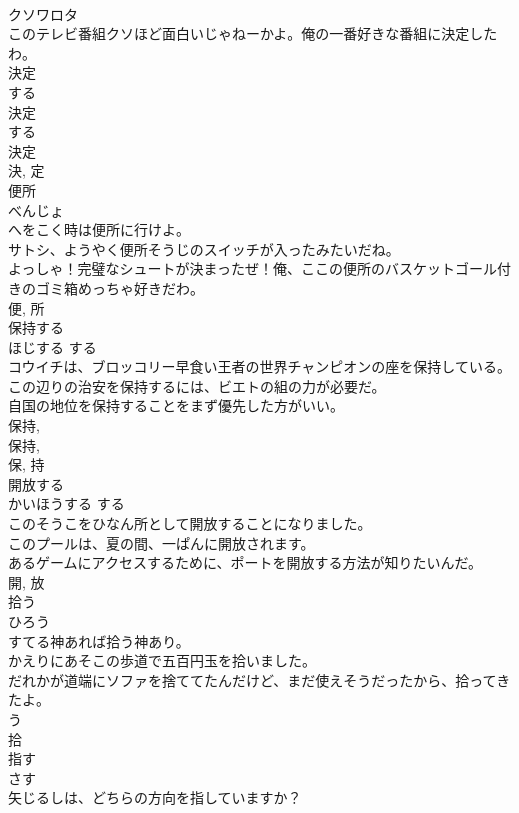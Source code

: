 \documentclass[8pt]{extreport}
\begin{document}
\begin{CJK}{UTF8}{min}
\\	クソワロタ
\\	このテレビ番組クソほど面白いじゃねーかよ。俺の一番好きな番組に決定したわ。	
\\	決定 
\\	する 
\\	決定 
\\	する 
\\	決定 
\\	決, 定	
\\	便所	
\\	べんじょ	
\\	へをこく時は便所に行けよ。	
\\	サトシ、ようやく便所そうじのスイッチが入ったみたいだね。	
\\	よっしゃ！完璧なシュートが決まったぜ！俺、ここの便所のバスケットゴール付きのゴミ箱めっちゃ好きだわ。	
\\	便, 所	
\\	保持する	
\\	ほじする	する 
\\	コウイチは、ブロッコリー早食い王者の世界チャンピオンの座を保持している。	
\\	この辺りの治安を保持するには、ビエトの組の力が必要だ。	
\\	自国の地位を保持することをまず優先した方がいい。	
\\	保持, 
\\	保持, 
\\	保, 持	
\\	開放する	
\\	かいほうする	する 
\\	このそうこをひなん所として開放することになりました。	
\\	このプールは、夏の間、一ぱんに開放されます。	
\\	あるゲームにアクセスするために、ポートを開放する方法が知りたいんだ。	
\\	開, 放	
\\	拾う	
\\	ひろう	
\\	すてる神あれば拾う神あり。	
\\	かえりにあそこの歩道で五百円玉を拾いました。	
\\	だれかが道端にソファを捨ててたんだけど、まだ使えそうだったから、拾ってきたよ。	
\\	う 
\\	拾	
\\	指す	
\\	さす	
\\	矢じるしは、どちらの方向を指していますか？	

\end{CJK}
\end{document}
